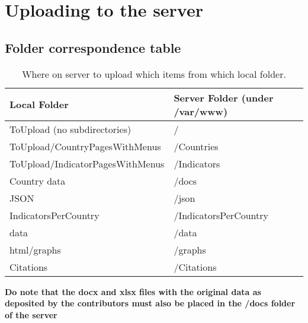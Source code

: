 \documentclass[a4paper]{article}
\begin{document}
\section{Uploading to the server}

\subsection{Folder correspondence table}

\begin{table}[h]
\centering
\caption{Where on server to upload which items from which local folder.}
\label{tab:uncertainty}
\begin{tabular}{l | l}
  \toprule
  Local Folder & Server Folder (under /var/www) \\
  \midrule
  ToUpload (no subdirectories) & / \\
  ToUpload/CountryPagesWithMenus & /Countries \\
  ToUpload/IndicatorPagesWithMenus & /Indicators \\
  Country data & /docs \\
  JSON & /json \\
  IndicatorsPerCountry & /IndicatorsPerCountry \\
  data & /data \\
  html/graphs & /graphs \\
  Citations & /Citations \\
  \bottomrule
\end{tabular}
\end{table}

\textbf{Do note that the docx and xlsx files with the original data as deposited 
by the contributors must also be placed in the /docs folder of the server}
\end{document}
